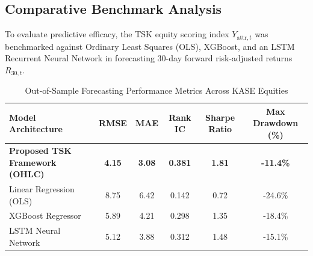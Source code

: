 \documentclass[pdflatex,sn-mathphys-num]{sn-jnl}
\theoremstyle{thmstyleone}
\theoremstyle{thmstyletwo}
\theoremstyle{thmstylethree}
\begin{document}
\begin{table}[h!]
\centering
\caption{Full-Year FY2025 Financial Metrics and Target Payout Ratios}
\label{tab:fy2025_targets}
\end{table}

\subsection{Comparative Benchmark Analysis}

To evaluate predictive efficacy, the TSK equity scoring index $Y_{\text{attr},t}$ was benchmarked against Ordinary Least Squares (OLS), XGBoost, and an LSTM Recurrent Neural Network in forecasting 30-day forward risk-adjusted returns $R_{30,t}$.

\begin{table}[h!]
\centering
\caption{Out-of-Sample Forecasting Performance Metrics Across KASE Equities}
\label{tab:benchmark}
\begin{tabular}{|l|c|c|c|c|c|}
\hline
\textbf{Model Architecture} & \textbf{RMSE} & \textbf{MAE} & \textbf{Rank IC} & \textbf{Sharpe Ratio} & \textbf{Max Drawdown (\%)} \\ \hline
\textbf{Proposed TSK Framework (OHLC)} & \textbf{4.15} & \textbf{3.08} & \textbf{0.381} & \textbf{1.81} & \textbf{-11.4\%} \\ \hline
Linear Regression (OLS) & 8.75 & 6.42 & 0.142 & 0.72 & -24.6\% \\ \hline
XGBoost Regressor & 5.89 & 4.21 & 0.298 & 1.35 & -18.4\% \\ \hline
LSTM Neural Network & 5.12 & 3.88 & 0.312 & 1.48 & -15.1\% \\ \hline
\end{tabular}
\end{table}
\end{document}
